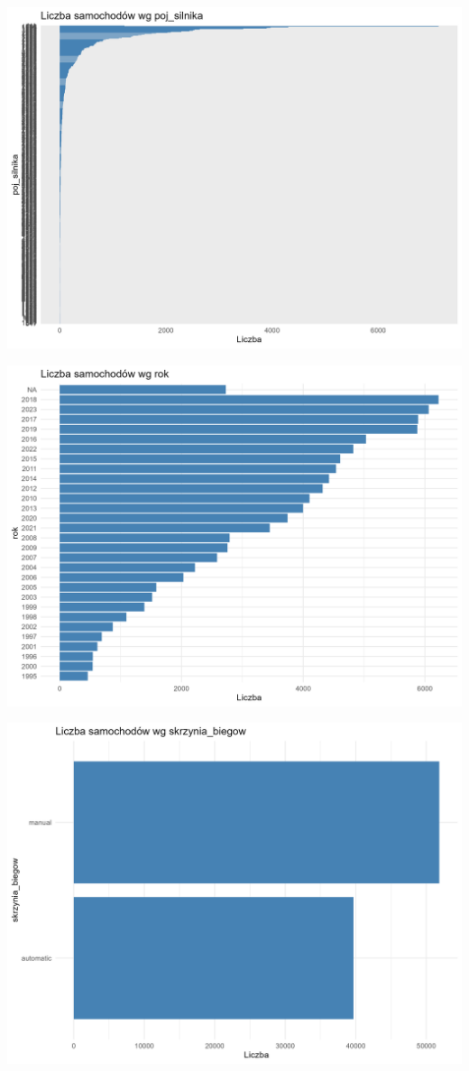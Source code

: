 \documentclass[
]{article}
\begin{document}
\includegraphics[width=1\linewidth]{analiza/wykres_poj_silnika}

\includegraphics[width=1\linewidth]{analiza/wykres_rok}

\includegraphics[width=1\linewidth]{analiza/wykres_skrzynia_biegow}
\end{document}
